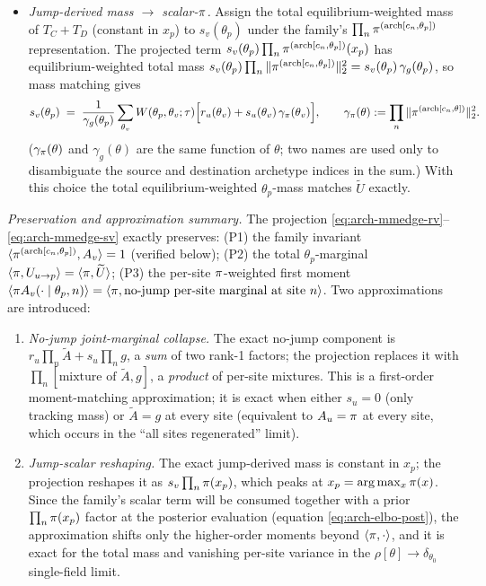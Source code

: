 \begin{itemize}[leftmargin=1.6em]
\item \emph{Jump-derived mass $\to$ scalar-$\pi$.} Assign the total
    equilibrium-weighted mass of $T_C + T_D$ (constant in $x_p$) to
    $s_v(\theta_p)$ under the family's $\prod_n \pi^{(\mathrm{arch}[c_n,
    \theta_p])}$ representation. The projected term $s_v(\theta_p)
    \prod_n \pi^{(\mathrm{arch}[c_n, \theta_p])}(x_p)$ has equilibrium-weighted
    total mass $s_v(\theta_p) \prod_n \|\pi^{(\mathrm{arch}[c_n, \theta_p])}\|_2^2
    = s_v(\theta_p)\,\gamma_g(\theta_p)$, so mass matching gives
    \begin{equation}
      s_v(\theta_p) \;=\; \frac{1}{\gamma_g(\theta_p)}
        \sum_{\theta_v} W(\theta_p, \theta_v; \tau)
        \Bigl[r_u(\theta_v) + s_u(\theta_v)\,\gamma_\pi(\theta_v)\Bigr],
        \qquad
        \gamma_\pi(\theta) := \prod_n \|\pi^{(\mathrm{arch}[c_n, \theta])}\|_2^2.
      \label{eq:arch-mmedge-sv}
    \end{equation}
    ($\gamma_\pi(\theta)$ and $\gamma_g(\theta)$ are the same function
    of $\theta$; two names are used only to disambiguate the source
    and destination archetype indices in the sum.) With this choice
    the total equilibrium-weighted $\theta_p$-mass matches
    $\widetilde U$ exactly.
\end{itemize}

\emph{Preservation and approximation summary.} The projection
\eqref{eq:arch-mmedge-rv}--\eqref{eq:arch-mmedge-sv} exactly preserves:
(P1) the family invariant $\langle \pi^{(\mathrm{arch}[c_n, \theta_p])},
A_v \rangle = 1$ (verified below); (P2) the total $\theta_p$-marginal
$\langle \pi, U_{u \to p} \rangle = \langle \pi, \widetilde U \rangle$;
(P3) the per-site $\pi$-weighted first moment
$\langle \pi A_v(\cdot \mid \theta_p, n) \rangle = \langle \pi,
\text{no-jump per-site marginal at site } n \rangle$. Two
approximations are introduced:
\begin{enumerate}[label=(A\arabic*),leftmargin=2.0em]
\item \emph{No-jump joint-marginal collapse.} The exact no-jump
    component is $r_u \prod_n \widetilde A + s_u \prod_n g$, a
    \emph{sum} of two rank-1 factors; the projection replaces it with
    $\prod_n [\text{mixture of } \widetilde A, g]$, a \emph{product}
    of per-site mixtures. This is a first-order moment-matching
    approximation; it is exact when either $s_u = 0$ (only tracking
    mass) or $\widetilde A = g$ at every site (equivalent to $A_u = \pi$
    at every site, which occurs in the ``all sites regenerated''
    limit).
\item \emph{Jump-scalar reshaping.} The exact jump-derived mass is
    constant in $x_p$; the projection reshapes it as
    $s_v \prod_n \pi(x_p)$, which peaks at
    $x_p = \arg\max_x \pi(x)$. Since the family's scalar term will be
    consumed together with a prior $\prod_n \pi(x_p)$ factor at the
    posterior evaluation (equation \eqref{eq:arch-elbo-post}), the
    approximation shifts only the higher-order moments beyond
    $\langle \pi, \cdot \rangle$, and it is exact for the total mass
    and vanishing per-site variance in the $\rho[\theta] \to
    \delta_{\theta_0}$ single-field limit.
\end{enumerate}

